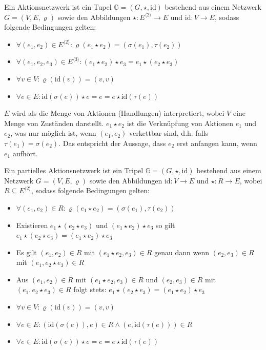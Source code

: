 \documentclass{article}
\begin{document}
\begin{definition}
  Ein Aktionsnetzwerk ist ein Tupel $\mathbb{G} = (G, \star, \text{id})$ 
  bestehend aus einem Netzwerk $G = (V, E, \varrho)$
  sowie den Abbildungen $\star \colon E^{\langle 2 \rangle} \to E$ und $\text{id} \colon V \to E$,
  sodass folgende Bedingungen gelten:
  \begin{itemize}
    \item $\forall (e_1, e_2) \in E^{\langle 2 \rangle} \colon \varrho(e_1 \star e_2) = (\sigma(e_1), \tau(e_2))$
    \item $\forall (e_1, e_2, e_3) \in E^{\langle 3 \rangle} \colon (e_1 \star e_2) \star e_3 = e_1 \star (e_2 \star e_3)$
    \item $\forall v \in V \colon \varrho(\text{id}(v)) = (v, v)$
    \item $\forall e \in E \colon \text{id}(\sigma(e)) \star e = e = e \star \text{id}(\tau(e))$
  \end{itemize}
  $E$ wird als die Menge von Aktionen (Handlungen) interpretiert,
  wobei $V$ eine Menge von Zuständen darstellt.
  $e_1 \star e_2$ ist die Verknüpfung von Aktionen $e_1$ und $e_2$,
  was nur möglich ist, wenn $(e_1, e_2)$ verkettbar sind, 
  d.h. falls $\tau(e_1) = \sigma(e_2)$.
  Das entspricht der Aussage, dass $e_2$ erst anfangen kann, wenn $e_1$ aufhört.
\end{definition}

\begin{definition}
  Ein partielles Aktionsnetzwerk ist ein Tripel $\mathbb{G} = (G, \star, \text{id})$
  bestehend aus einem Netzwerk $G = (V, E, \varrho)$ sowie den Abbildungen 
  $\text{id} \colon V  \to E$ und $\star \colon R \to E$, wobei $R \subseteq E^{\langle 2 \rangle}$,
  sodass folgende Bedingungen gelten:
  \begin{itemize}
      \item $\forall (e_1, e_2) \in R \colon \varrho(e_1 \star e_2) = (\sigma(e_1), \tau(e_2))$
      \item Existieren $e_1 \star (e_2 \star e_3)$ und $(e_1 \star e_2) \star e_3$
            so gilt $e_1 \star (e_2 \star e_3) = (e_1 \star e_2) \star e_3$
      \item Es gilt $(e_1, e_2) \in R$ mit $(e_1 \star e_2, e_3) \in R$ genau dann wenn 
            $(e_2, e_3) \in R$ mit $(e_1, e_2 \star e_3) \in R$
      \item Aus $(e_1, e_2) \in R$ mit $(e_1 \star e_2, e_3) \in R$ und
            $(e_2, e_3) \in R$ mit $(e_1, e_2 \star e_3) \in R$ folgt stets:
            $e_1 \star (e_2 \star e_3) = (e_1 \star e_2) \star e_3$
      \item $\forall v \in V \colon \varrho(\text{id}(v)) = (v, v)$
      \item $\forall e \in E \colon (\text{id}(\sigma(e)), e) \in R \wedge (e, \text{id}(\tau(e))) \in R$
      \item $\forall e \in E \colon \text{id}(\sigma(e)) \star e = e = e \star \text{id}(\tau(e))$
  \end{itemize}
\end{definition}
\end{document}
